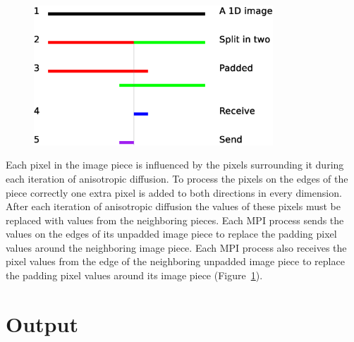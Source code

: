 \documentclass{InsightArticle}
\begin{document}
\begin{figure}
\center
\includegraphics[width=0.8\textwidth]{ImageOverlap.eps}
\label{fig:Image Overlap}
\end{figure}

Each pixel in the image piece is influenced by the pixels 
surrounding it during each iteration of anisotropic 
diffusion. To process the pixels on the edges of the piece 
correctly one extra pixel is added to both directions in 
every dimension. After each iteration of anisotropic 
diffusion the values of these pixels must be replaced with 
values from the neighboring pieces. Each MPI process sends 
the values on the edges of its unpadded image piece to 
replace the padding pixel values around the neighboring 
image piece. Each MPI process also receives the pixel 
values from the edge of the neighboring unpadded image 
piece to replace the padding pixel values around its image 
piece (Figure~\ref{fig:Image Overlap}).

\section{Output}
\end{document}
